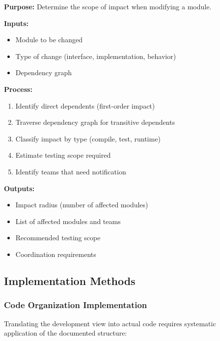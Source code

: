 \documentclass[11pt,letterpaper]{article}
\begin{document}
\begin{definitionbox}
\textbf{Purpose:} Determine the scope of impact when modifying a module.

\textbf{Inputs:}
\begin{itemize}[nosep]
    \item Module to be changed
    \item Type of change (interface, implementation, behavior)
    \item Dependency graph
\end{itemize}

\textbf{Process:}
\begin{enumerate}[nosep]
    \item Identify direct dependents (first-order impact)
    \item Traverse dependency graph for transitive dependents
    \item Classify impact by type (compile, test, runtime)
    \item Estimate testing scope required
    \item Identify teams that need notification
\end{enumerate}

\textbf{Outputs:}
\begin{itemize}[nosep]
    \item Impact radius (number of affected modules)
    \item List of affected modules and teams
    \item Recommended testing scope
    \item Coordination requirements
\end{itemize}
\end{definitionbox}

\subsection{Implementation Methods}

\subsubsection{Code Organization Implementation}

Translating the development view into actual code requires systematic application of the documented structure:
\end{document}
